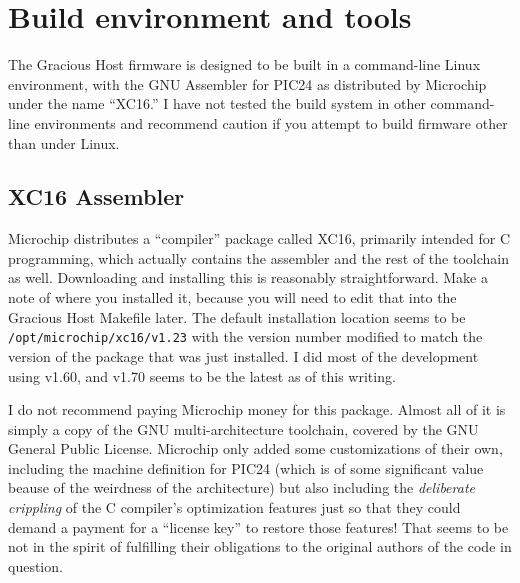 
%
%
%
%
%
%

\chapter{Build environment and tools}

The Gracious Host firmware is designed to be built in a command-line Linux
environment, with the GNU Assembler for PIC24 as distributed by Microchip
under the name ``XC16.'' I have not tested the build system in other
command-line environments and recommend caution if you attempt to build
firmware other than under Linux.

\section{XC16 Assembler}

Microchip distributes a ``compiler'' package called XC16, primarily intended
for C programming, which actually contains the assembler and the rest of the
toolchain as well.  Downloading and installing this is reasonably
straightforward.  Make a note of where you installed it, because you will
need to edit that into the Gracious Host Makefile later.  The default
installation location seems to be \texttt{/opt/microchip/xc16/v1.23} with
the version number modified to match the version of the package that was
just installed.  I did most of the development using v1.60, and v1.70 seems
to be the latest as of this writing.

I do not recommend paying Microchip money for this package.  Almost all of
it is simply a copy of the GNU multi-architecture toolchain, covered by the
GNU General Public License.  Microchip only added some customizations of
their own, including the machine definition for PIC24 (which is of some
significant value beause of the weirdness of the architecture) but also
including the \emph{deliberate crippling} of the C compiler's optimization
features just so that they could demand a payment for a ``license key'' to
restore those features!  That seems to be not in the spirit of fulfilling
their obligations to the original authors of the code in question.


